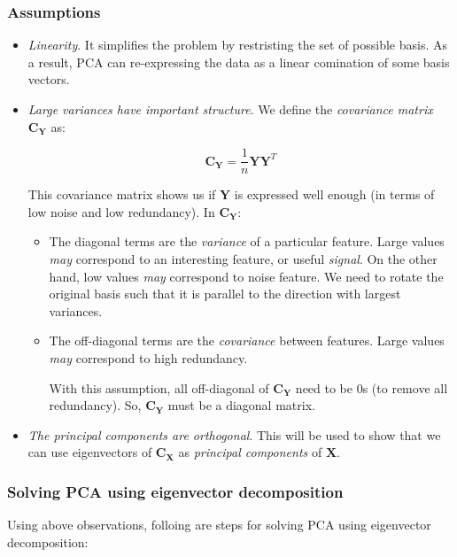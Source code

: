 \subsubsection*{Assumptions}

\begin{itemize}
	\item \emph{Linearity}. It simplifies the problem by restristing the set of possible basis. As a result, PCA can re-expressing the data as a linear comination of some basis vectors.
	\item \emph{Large variances have important structure}. We define the \emph{covariance matrix} $\bm{C_Y}$ as:
	
	\begin{equation*}
		\bm{C_Y} = \dfrac{1}{n}\bm{YY}^T
	\end{equation*}
	
	This covariance matrix shows us if $\bm{Y}$ is expressed well enough (in terms of low noise and low redundancy). In $\bm{C_Y}$:
	
	\begin{itemize}
		\item The diagonal terms are the \emph{variance} of a particular feature.  Large values \emph{may} correspond to an interesting feature, or useful \emph{signal}. On the other hand, low values \emph{may} correspond to noise feature. We need to rotate the original basis such that it is parallel to the direction with largest variances.
		
		\item The off-diagonal terms are the \emph{covariance} between features. Large values \emph{may} correspond to high redundancy.
	
	With this assumption, all off-diagonal of $\bm{C_Y}$ need to be 0s (to remove all redundancy). So, $\bm{C_Y}$ must be a diagonal matrix.
	\end{itemize}
	
		\item\emph{The principal components are orthogonal}. This will be used to show that we can use eigenvectors of $\bm{C_X}$ as \emph{principal components} of $\bm{X}$.
	
\end{itemize}

\subsubsection*{Solving PCA using eigenvector decomposition}

Using above observations, folloing are steps for solving PCA using eigenvector decomposition:

